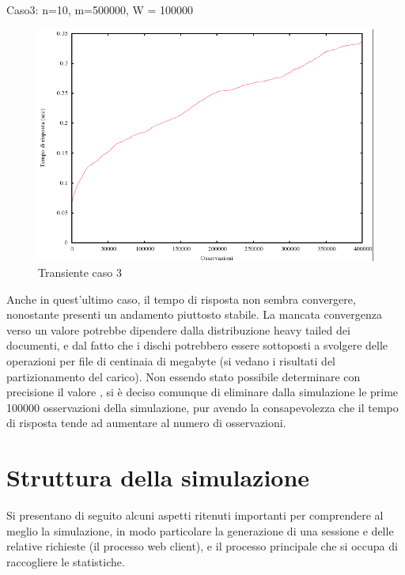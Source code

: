 Caso3: n=10, m=500000, W = 100000
\begin{figure}[H]
\begin{center}
\includegraphics[scale=0.5]{etc/grafico3.png}
\caption{Transiente caso 3}
\label{Grafico3}
\end{center}
\end{figure}
Anche in quest'ultimo caso, il tempo di risposta non sembra convergere, nonostante presenti un andamento piuttosto stabile. La mancata convergenza verso un valore potrebbe dipendere dalla distribuzione heavy tailed dei documenti, e dal fatto che i dischi potrebbero essere sottoposti a svolgere delle operazioni per file di centinaia di megabyte (si vedano i risultati del partizionamento del carico). Non essendo stato possibile determinare con precisione il valore , si è deciso comunque  di eliminare dalla simulazione le prime 100000 osservazioni della simulazione, pur avendo la consapevolezza che il tempo di risposta tende ad aumentare al numero di osservazioni.

\section{Struttura della simulazione}
Si presentano di seguito alcuni aspetti ritenuti importanti per comprendere al meglio la simulazione, in modo particolare la generazione di una sessione e delle relative richieste (il processo web client), e il processo principale che si occupa di raccogliere le statistiche.
